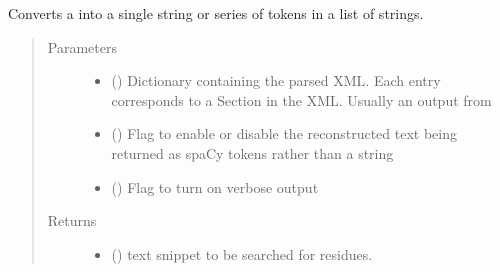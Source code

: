 \documentclass[letterpaper,10pt,english]{sphinxmanual}
\begin{document}

\begin{fulllineitems}
Converts a  into a single string or series of tokens in a list of strings.
\begin{quote}\begin{description}
\item[{Parameters}] \leavevmode\begin{itemize}
\item {} 
 () \textendash{} Dictionary containing the parsed XML. Each entry corresponds to a Section
in the XML. Usually an output from {\hyperref[\detokenize{functions:pyresid.get_sections_text}]{}}

\item {} 
 (\sphinxstyleliteralemphasis{\sphinxupquote{, }}\sphinxstyleliteralemphasis{\sphinxupquote{, }}) \textendash{} Flag to enable or disable the reconstructed text being returned as spaCy tokens
rather than a string

\item {} 
 (\sphinxstyleliteralemphasis{\sphinxupquote{, }}\sphinxstyleliteralemphasis{\sphinxupquote{, }}) \textendash{} Flag to turn on verbose output

\end{itemize}

\item[{Returns}] \leavevmode
\begin{itemize}
\item {} 
 () \textendash{} text snippet to be searched for residues.


\end{itemize}
\end{description}
\end{quote}
\end{fulllineitems}
\end{document}
